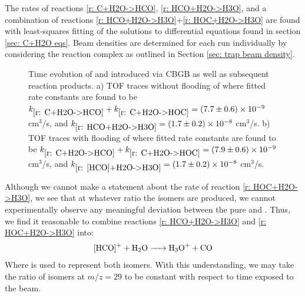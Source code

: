 The rates of reactions \ref{r: C+H2O->HCO}, \ref{r: HCO+H2O->H3O}, and a combination of reactions \ref{r: HCO+H2O->H3O}+\ref{r: HOC+H2O->H3O} are found with least-squares fitting of the solutions to differential equations found in section \ref{sec: C+H2O eqs}. Beam densities are determined for each run individually by considering the  reaction complex as outlined in Section \ref{sec: trap beam density}.

\begin{figure}[H]
	\centering
	\caption{Time evolution of  and  introduced via CBGB as well as subsequent reaction products. a) TOF traces without flooding of  where fitted rate constants are found to be $k_{\ref{r: C+H2O->HCO}}+k_{\ref{r: C+H2O->HOC}} = (7.7 \pm 0.6) \times 10^{-9}$ cm$^3$/s, and $k_{\ref{r: HCO+H2O->H3O}} = (1.7 \pm 0.2) \times 10^{-8}$ cm$^3$/s. b) TOF traces with flooding of  where fitted rate constants are found to be $k_{\ref{r: C+H2O->HCO}}+k_{\ref{r: C+H2O->HOC}} = (7.9 \pm 0.6) \times 10^{-9}$ cm$^3$/s, and $k_{\ref{r: [HCO]+H2O->H3O}} = (1.7 \pm 0.2) \times 10^{-8}$ cm$^3$/s.}
	\label{fig: [HCO]+H2O rate}
\end{figure}

Although we cannot make a statement about the rate of reaction \ref{r: HOC+H2O->H3O}, we see that at whatever ratio the isomers are produced, we cannot experimentally observe any meaningful deviation between the pure  and . Thus, we find it reasonable to combine reactions \ref{r: HCO+H2O->H3O} and \ref{r: HOC+H2O->H3O} into:
\begin{equation}
	\ce{[HCO]+ + H2O -> H3O+ + CO} \label{r: [HCO]+H2O->H3O}
\end{equation}
Where \ce{[HCO]+} is used to represent both isomers. With this understanding, we may take the ratio of isomers at $m/z=29$ to be constant with respect to time exposed to the beam.

